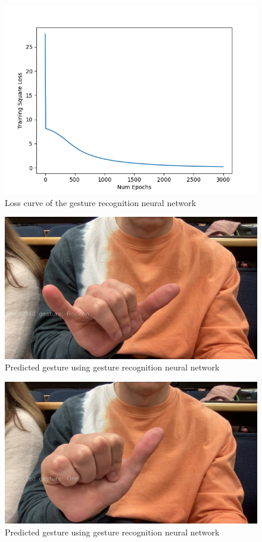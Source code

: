\begin{figure}[h]
    \centering
    \includegraphics[width=0.6\linewidth]{figures/gesture_recognizer_loss_curve.png}
    \caption{Loss curve of the gesture recognition neural network}
    \label{fig:gesture_recognizer_loss_curve}
\end{figure}

\begin{figure}[h]
    \centering
    \includegraphics[width=0.6\linewidth]{figures/predictedGesture_rockon.jpg}
    \caption{Predicted gesture using gesture recognition neural network}
    \label{fig:predictedGesture_rockon.png}
\end{figure}

\begin{figure}[h]
    \centering
    \includegraphics[width=0.6\linewidth]{figures/predictedGesture_one.jpg}
    \caption{Predicted gesture using gesture recognition neural network}
    \label{fig:predictedGesture_one}
\end{figure}


